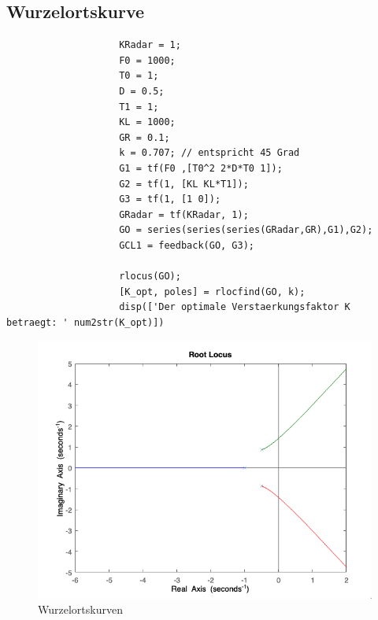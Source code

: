 \documentclass{article}
\begin{document}
			\subsection{Wurzelortskurve}
				\begin{lstlisting}
					KRadar = 1;
					F0 = 1000;
					T0 = 1;
					D = 0.5;
					T1 = 1;
					KL = 1000;
					GR = 0.1;
					k = 0.707; // entspricht 45 Grad
					G1 = tf(F0 ,[T0^2 2*D*T0 1]);
					G2 = tf(1, [KL KL*T1]);
					G3 = tf(1, [1 0]);
					GRadar = tf(KRadar, 1);
					GO = series(series(series(GRadar,GR),G1),G2);
					GCL1 = feedback(GO, G3);

					rlocus(GO);
					[K_opt, poles] = rlocfind(GO, k);
					disp(['Der optimale Verstaerkungsfaktor K betraegt: ' num2str(K_opt)])
				\end{lstlisting}
				\begin{figure}[h]
			    	\includegraphics[scale=0.5, center]{./Aufg4_g_rootlocus.png}
				    \caption{Wurzelortskurven}
				    \label{fig:label}
				\end{figure}
\newpage
\end{document}
